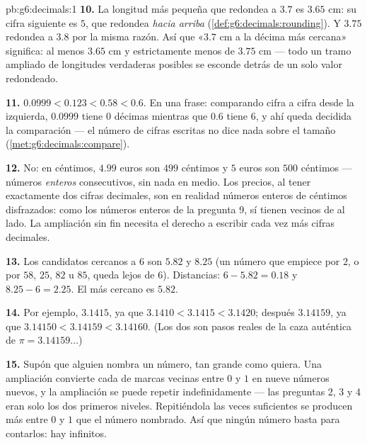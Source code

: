 \begin{solution}{pb:g6:decimals:1}
\textbf{10.} La longitud más pequeña que redondea a $3.7$ es $3.65$ cm:
su cifra siguiente es $5$, que redondea \emph{hacia arriba}
(\cref{def:g6:decimals:rounding}). Y $3.75$ redondea a $3.8$
por la misma razón. Así que «$3.7$ cm a la décima más cercana» significa:
al menos $3.65$ cm y estrictamente menos de $3.75$ cm --- todo un
tramo ampliado de longitudes verdaderas posibles se esconde detrás de un solo
valor redondeado.

\textbf{11.} $0.0999 < 0.123 < 0.58 < 0.6$. En una frase:
comparando cifra a cifra desde la izquierda, $0.0999$ tiene $0$ décimas
mientras que $0.6$ tiene $6$, y ahí queda decidida la comparación --- el
número de cifras escritas no dice nada sobre el tamaño
(\cref{met:g6:decimals:compare}).

\textbf{12.} No: en céntimos, $4.99$ euros son $499$ céntimos y $5$
euros son $500$ céntimos --- números \emph{enteros} consecutivos, sin
nada en medio. Los precios, al tener exactamente dos cifras decimales,
son en realidad números enteros de céntimos disfrazados: como los números
enteros de la pregunta 9, sí tienen vecinos de al lado. La
ampliación sin fin necesita el derecho a escribir cada vez más cifras decimales.

\textbf{13.} Los candidatos cercanos a $6$ son $5.82$ y $8.25$ (un
número que empiece por $2$, o por $58$, $25$, $82$ u $85$, queda lejos
de $6$). Distancias: $6 - 5.82 = 0.18$ y $8.25 - 6 = 2.25$.
El más cercano es $5.82$.

\textbf{14.} Por ejemplo, $3.1415$, ya que
$3.1410 < 3.1415 < 3.1420$; después $3.14159$, ya que
$3.14150 < 3.14159 < 3.14160$. (Los dos son pasos reales de la
caza auténtica de $\pi = 3.14159\dots$)

\textbf{15.} Supón que alguien nombra un número, tan grande como
quiera. Una ampliación convierte cada  de marcas vecinas
entre $0$ y $1$ en nueve números nuevos, y la ampliación se puede
repetir indefinidamente --- las preguntas 2, 3 y 4 eran solo los dos primeros
niveles. Repitiéndola las veces suficientes se producen más  entre $0$ y $1$ que el número nombrado. Así que ningún número
basta para contarlos: hay infinitos.
\end{solution}
